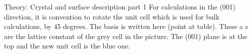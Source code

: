 \begin{frame}{Theory: Crystal and surface description part 1}
{	For calculations in the (001) direction, it is convention to rotate the unit cell which is used for bulk calculations, by 45 degrees. The basis is written here (point at table). These a s are the lattice constant of the grey cell in the picture. The (001) plane is at the top and the new unit cell is the blue one.
	}
\end{frame}

